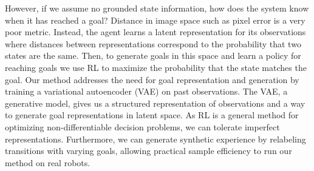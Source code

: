 However, if we assume no grounded state information, how does the system know when it has reached a goal? Distance in image space
such as pixel error is a very poor metric. Instead, the agent learns a latent representation for its observations where distances between representations correspond to the probability that two states are the same. Then, to generate goals in this space and learn a policy for reaching goals we use RL to maximize the probability that the state matches the goal.
Our method addresses the need for goal representation and generation by training a variational autoencoder (VAE) on past observations. The VAE, a generative model, gives us a structured representation of observations and a way to generate goal representations in latent space. As RL is a general method for optimizing non-differentiable decision problems, we can tolerate imperfect representations. Furthermore, we can generate synthetic experience by relabeling transitions with varying goals, allowing practical sample efficiency to run our method on real robots.

